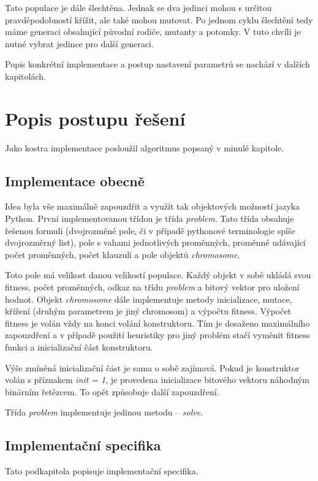 \documentclass[a4paper]{article}
\begin{document}
	Tato populace je dále šlechtěna. Jednak se dva jedinci mohou s určitou pravděpodobností křížit, ale také mohou mutovat. Po jednom cyklu šlechtění tedy máme generaci obsahující původní rodiče, mutanty a potomky. V tuto chvíli je nutné vybrat jedince pro další generaci.
	
	Popis konkrétní implementace a postup nastavení parametrů se nachází v dalších kapitolách.
	

\section{Popis postupu řešení}
	Jako kostra implementace posloužil algoritmus popsaný v minulé kapitole.
	
	\subsection{Implementace obecně}
		Idea byla vše maximálně zapouzdřit a využít tak objektových možností jazyka Python. První implementovanou třídou je třída \textit{problem}. Tato třída obsahuje řešenou formuli (dvojrozměné pole, či v případě pythonové terminologie spíše dvojrozměrný list), pole s vahami jednotlivých proměnných, proměnné udávající počet proměnných, počet klauzulí a pole objektů \textit{chromosome}.
		
		Toto pole má velikost danou velikostí populace. Každý objekt v sobě ukládá svou fitness, počet proměnných, odkaz na třídu \textit{problem} a bitový vektor pro uložení hodnot. Objekt \textit{chromosome} dále implementuje metody inicializace, mutace, křížení (druhým parametrem je jiný chromosom) a výpočtu fitness. Výpočet fitness je volán vždy na konci volání konstruktoru. Tím je dosaženo maximálního zapouzdření a v případě použití heuristiky pro jiný problém stačí vyměnit fitness funkci a inicializační část konstruktoru.
		
		Výše zmíněná inicializační část je sama o sobě zajímavá. Pokud je konstruktor volán s příznakem \textit{init = 1}, je provedena inicializace bitového vektoru náhodným binárním řetězcem. To opět způsobuje další zapouzdření.
		
		Třída \textit{problem} implementuje jedinou metodu -- \textit{solve}. 
	
	\subsection{Implementační specifika}
		Tato podkapitola popisuje implementační specifika.
	
\end{document}
